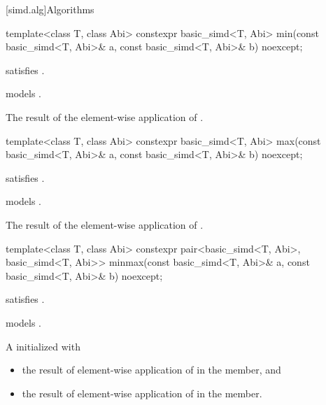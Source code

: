[simd.alg]{Algorithms}

\begin{itemdecl}
template<class T, class Abi> constexpr basic_simd<T, Abi> min(const basic_simd<T, Abi>& a, const basic_simd<T, Abi>& b) noexcept;
\end{itemdecl}

\begin{itemdescr}
  \pnum\constraints
   satisfies .

  \pnum\expects
   models .

  \pnum\returns
  The result of the element-wise application of  \foralli.
\end{itemdescr}

\begin{itemdecl}
template<class T, class Abi> constexpr basic_simd<T, Abi> max(const basic_simd<T, Abi>& a, const basic_simd<T, Abi>& b) noexcept;
\end{itemdecl}

\begin{itemdescr}
  \pnum\constraints
   satisfies .

  \pnum\expects
   models .

  \pnum\returns
  The result of the element-wise application of  \foralli.
\end{itemdescr}

\begin{itemdecl}
template<class T, class Abi>
  constexpr pair<basic_simd<T, Abi>, basic_simd<T, Abi>> minmax(const basic_simd<T, Abi>& a, const basic_simd<T, Abi>& b) noexcept;
\end{itemdecl}

\begin{itemdescr}
  \pnum\constraints
   satisfies .

  \pnum\expects
   models .

  \pnum\returns
  A  initialized with
  \begin{itemize}
    \item the result of element-wise application of  \foralli{} in the  member, and
    \item the result of element-wise application of  \foralli{} in the  member.
  \end{itemize}
\end{itemdescr}

